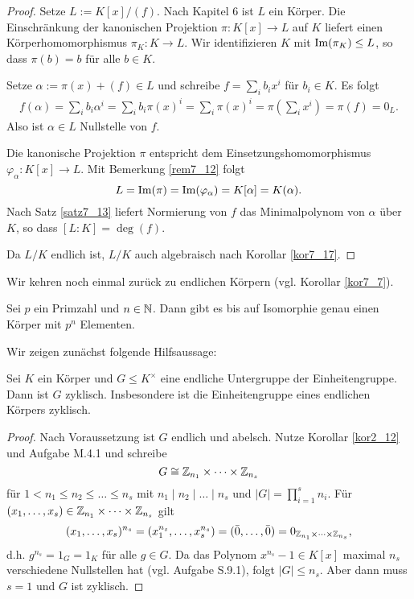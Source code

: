 \begin{proof}
	Setze $L := K[x]/(f)$. Nach Kapitel 6 ist $L$ ein Körper. Die Einschränkung der kanonischen Projektion $\pi \colon K[x] \to L$ auf $K$ liefert einen Körperhomomorphismus $\pi_K \colon K \to L$. Wir identifizieren $K$ mit $\mathrm{Im}(\pi_K) \leq L$, so dass $\pi(b) = b$ für alle $b \in K$. 
	
	Setze $\alpha := \pi(x) + (f) \in L$ und schreibe $f = \sum_{i} b_i x^i$ für $b_i \in K$. Es folgt
	\begin{align*}
		f(\alpha) = \sum_{i} b_i \alpha^i = \sum_i b_i \pi(x)^i = \sum_{i} \pi(x)^i = \pi\left(\sum_{i} x^i\right) = \pi(f) = 0_L.
 	\end{align*}
 	Also ist $\alpha \in L$ Nullstelle von $f$.
 	
 	Die kanonische Projektion $\pi$ entspricht dem Einsetzungshomomorphismus $\varphi_\alpha \colon K[x] \to L$. Mit Bemerkung \ref{rem7_12} folgt
 	\[L = \mathrm{Im}(\pi) = \mathrm{Im}(\varphi_\alpha) = K[\alpha] = K(\alpha).\]
 	Nach Satz \ref{satz7_13} liefert Normierung von $f$ das Minimalpolynom von $\alpha$ über $K$, so dass $[L:K] = \deg(f)$.
 	
 	Da $L/K$ endlich ist, $L/K$ auch algebraisch nach Korollar \ref{kor7_17}.
\end{proof}
Wir kehren noch einmal zurück zu endlichen Körpern (vgl. Korollar \ref{kor7_7}).
\begin{satz}\label{satz7_20}
	Sei $p$ ein Primzahl und $n \in \mathbb{N}$. Dann gibt es bis auf Isomorphie genau einen Körper mit $p^n$ Elementen.
\end{satz}
Wir zeigen zunächst folgende Hilfsaussage:
\begin{prop}\label{prop7_21}
	Sei $K$ ein Körper und $G \leq K^\times$ eine endliche Untergruppe der Einheitengruppe. Dann ist $G$ zyklisch. Insbesondere ist die Einheitengruppe eines endlichen Körpers zyklisch. 
\end{prop}
\begin{proof}
	Nach Voraussetzung ist $G$ endlich und abelsch. Nutze Korollar \ref{kor2_12} und Aufgabe M.4.1 und schreibe
	\[G \cong \mathbb{Z}_{n_1} \times \dots \times \mathbb{Z}_{n_s}\]
	für $1 < n_1 \leq n_2 \leq \dots \leq n_s$ mit $n_1 \mid n_2 \mid \dots \mid n_s$ und $|G| = \prod_{i=1}^{s} n_i$. Für $(x_1, \dots, x_s) \in \mathbb{Z}_{n_1} \times \dots \times \mathbb{Z}_{n_s}$ gilt
	\[(x_1, \dots, x_s)^{n_s} = (x_1^{n_s}, \dots, x_s^{n_s}) = (\bar{0}, \dots, \bar{0}) = 0_{\mathbb{Z}_{n_1} \times \dots \times \mathbb{Z}_{n_s}},\]
	d.h. $g^{n_s} = 1_G = 1_K$ für alle $g \in G$. Da das Polynom $x^{n_s} - 1 \in K[x]$ maximal $n_s$ verschiedene Nullstellen hat (vgl. Aufgabe S.9.1), folgt $|G| \leq n_s$. Aber dann muss $s = 1$ und $G$ ist zyklisch.
\end{proof}